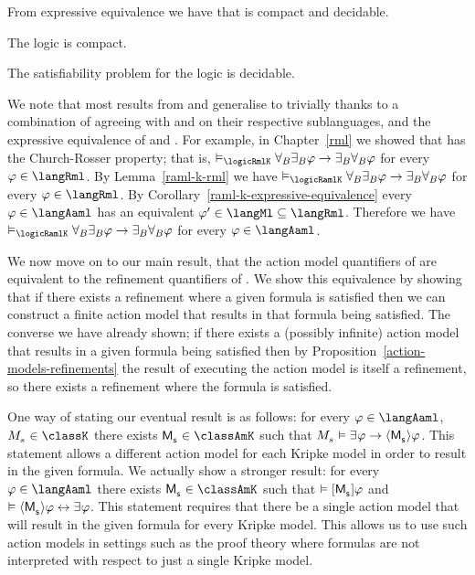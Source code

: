 From expressive equivalence we have that \logicRmlK{} is compact and decidable.

\begin{corollary}
The logic \logicRamlK{} is compact.
\end{corollary}

\begin{corollary}
The satisfiability problem for the logic \logicRamlK{} is decidable.
\end{corollary}

We note that most results from \logicAmlK{} and \logicRmlK{} generalise to \logicRamlK{} trivially thanks to a combination of \logicRamlK{} agreeing with \logicAmlK{} and \logicRmlK{} on their respective sublanguages, and the expressive equivalence of \logicRamlK{} and \logicK{}.
For example, in Chapter~\ref{rml} we showed that \logicRmlK{} has the Church-Rosser property; that is, $\entails_\logicRmlK \allrefsBs \somerefsBs \phi \implies \somerefsBs \allrefsBs \phi$ for every $\phi \in \langRml$.
By Lemma~\ref{raml-k-rml} we have $\entails_\logicRamlK \allrefsBs \somerefsBs \phi \implies \somerefsBs \allrefsBs \phi$ for every $\phi \in \langRml$.
By Corollary~\ref{raml-k-expressive-equivalence} every $\phi \in \langAaml$ has an equivalent $\phi' \in \langMl \subseteq \langRml$.
Therefore we have $\entails_\logicRamlK \allrefsBs \somerefsBs \phi \implies \somerefsBs \allrefsBs \phi$ for every $\phi \in \langAaml$.

We now move on to our main result, that the action model quantifiers of \logicAamlK{} are equivalent to the refinement quantifiers of \logicRmlK{}.
We show this equivalence by showing that if there exists a refinement where a given formula is satisfied then we can construct a finite action model that results in that formula being satisfied.
The converse we have already shown; if there exists a (possibly infinite) action model that results in a given formula being satisfied then by Proposition~\ref{action-models-refinements} the result of executing the action model is itself a refinement, so there exists a refinement where the formula is satisfied.

One way of stating our eventual result is as follows: for every $\phi \in \langAaml$, $\kPModel{\kStateS} \in \classK$ there exists $\aPModel{\aStateS} \in \classAmK$ such that $\kPModel{\kStateS} \entails \somerefs \phi \implies \actionE{\aPModel{\aStateS}} \phi$.
This statement allows a different action model for each Kripke model in order to result in the given formula.
We actually show a stronger result: for every $\phi \in \langAaml$ there exists $\aPModel{\aStateS} \in \classAmK$ such that $\entails \actionA{\aPModel{\aStateS}} \phi$ and $\entails \actionE{\aPModel{\aStateS}} \phi \iff \somerefs \phi$.
This statement requires that there be a single action model that will result in the given formula for every Kripke model.
This allows us to use such action models in settings such as the proof theory where formulas are not interpreted with respect to just a single Kripke model.

